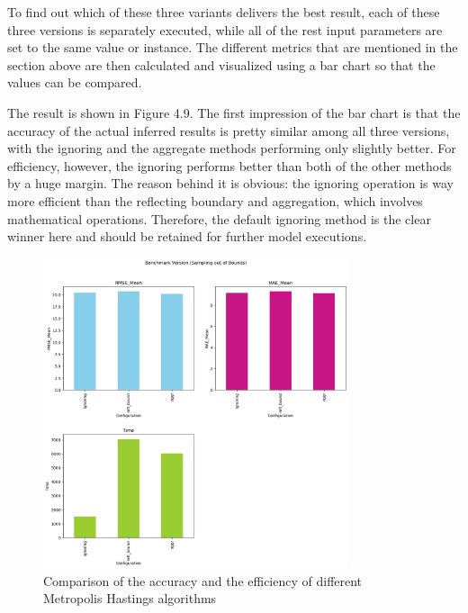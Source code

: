 To find out which of these three variants delivers the best result, each of these three versions is separately executed, while all of the rest input parameters are set to the same value or instance. The different metrics that are mentioned in the section above are then calculated and visualized using a bar chart so that the values can be compared. 

The result is shown in Figure 4.9. The first impression of the bar chart is that the accuracy of the actual inferred results is pretty similar among all three versions, with the ignoring and the aggregate methods performing only slightly better. For efficiency, however, the ignoring performs better than both of the other methods by a huge margin. The reason behind it is obvious: the ignoring operation is way more efficient than the reflecting boundary and aggregation, which involves mathematical operations. Therefore, the default ignoring method is the clear winner here and should be retained for further model executions.


\begin{figure}
    \centering
    \includegraphics[width=0.8\textwidth]{figures/basic_mh/benchmark/sampling_otb.png}
    \captionsetup{width=.8\textwidth}
    \caption{Comparison of the accuracy and the efficiency of different Metropolis Hastings algorithms}
    \label{fig:enter-label}
\end{figure}



